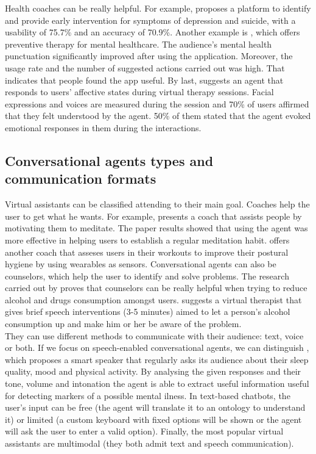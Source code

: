 \documentclass[12pt,english]{article}
\begin{document}
Health coaches can be really helpful. For example, \cite{Breso2016297} proposes a platform to identify and provide early intervention for symptoms of depression and suicide, with a usability of 75.7\% and an accuracy of 70.9\%. Another example is \cite{Hirano2017}, which offers preventive therapy for mental healthcare. The audience's mental health punctuation significantly improved after using the application. Moreover, the usage rate and the number of suggested actions carried out was high. That indicates that people found the app useful. By last, \cite{Ring2016} suggests an agent that responds to users' affective states during virtual therapy sessions. Facial expressions and voices are measured during the session and 70\% of users affirmed that they felt understood by the agent. 50\% of them stated that the agent evoked emotional responses in them during the interactions.

\newpage
\subsection{Conversational agents types and communication formats}

Virtual assistants can be classified attending to their main goal. Coaches help the user to get what he wants. For example, \cite{HUDLICKA2013160} presents a coach that assists people by motivating them to meditate. The paper results showed that using the agent was more effective in helping users to establish a regular meditation habit. \cite{Guo2020} offers another coach that asseses users in their workouts to improve their postural hygiene by using wearables as sensors. Conversational agents can also be counselors, which help the user to identify and solve problems. The research carried out by \cite{Drislane2020158} proves that counselors can be really helpful when trying to reduce alcohol and drugs consumption amongst users. \cite{Yasavur2014381} suggests a virtual therapist that gives brief speech interventions (3-5 minutes) aimed to let a person's alcohol consumption up and make him or her be aware of the problem. \\

They can use different methods to communicate with their audience: text, voice or both. If we focus on speech-enabled conversational agents, we can distinguish \cite{Maharjan2019929}, which proposes a smart speaker that regularly asks its audience about their sleep quality, mood and physical activity. By analysing the given responses and their tone, volume and  intonation the agent is able to extract useful information useful for detecting markers of a possible mental ilness. In text-based chatbots, the user's input can be free (the agent will translate it to an ontology to understand it) or limited (a custom keyboard with fixed options will be shown or the agent will ask the user to enter a valid option). Finally, the most popular virtual assistants are multimodal (they both admit text and speech communication).
\end{document}
